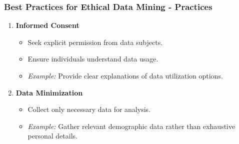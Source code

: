 \documentclass[aspectratio=169]{beamer}
\begin{document}
\begin{frame}[fragile]
    \frametitle{Best Practices for Ethical Data Mining - Practices}
    \begin{enumerate}
        \item \textbf{Informed Consent}
            \begin{itemize}
                \item Seek explicit permission from data subjects.
                \item Ensure individuals understand data usage.
                \item \textit{Example:} Provide clear explanations of data utilization options.
            \end{itemize}

        \item \textbf{Data Minimization}
            \begin{itemize}
                \item Collect only necessary data for analysis.
                \item \textit{Example:} Gather relevant demographic data rather than exhaustive personal details.
            \end{itemize}
    \end{enumerate}
\end{frame}
\end{document}
